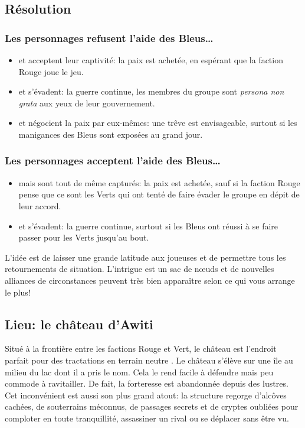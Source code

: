 \subsection{Résolution}

\subsubsection{Les personnages refusent l'aide des Bleus\dots}
\begin{itemize}
	\item et acceptent leur captivité: la paix est achetée, en espérant que la faction Rouge joue le jeu.
	\item et s'évadent: la guerre continue, les membres du groupe sont \emph{persona non grata} aux yeux de leur gouvernement.
	\item et négocient la paix par eux-mêmes: une trêve est envisageable, surtout si les manigances des Bleus sont exposées au grand jour.
\end{itemize}

\subsubsection{Les personnages acceptent l'aide des Bleus\dots}
\begin{itemize}
	\item mais sont tout de même capturés: la paix est achetée, sauf si la faction Rouge pense que ce sont les Verts qui ont tenté de faire évader le groupe en dépit de leur accord.
	\item et s'évadent: la guerre continue, surtout si les Bleus ont réussi à se faire passer pour les Verts jusqu'au bout.
\end{itemize}

L'idée est de laisser une grande latitude aux joueuses et de permettre tous les retournements de situation.
L'intrigue est un sac de nœuds et de nouvelles alliances de circonstances peuvent très bien apparaître selon ce qui vous arrange le plus!

\subsection*{Lieu: le château d'Awiti}

\begin{tcolorbox}[colback=black!1!white]
Situé à la frontière entre les factions Rouge et Vert, le château est l'endroit parfait pour des tractations en terrain \og neutre \fg.
Le château s'élève sur une île au milieu du lac dont il a pris le nom. Cela le rend facile à défendre mais peu commode à ravitailler.
De fait, la forteresse est abandonnée depuis des lustres.
Cet inconvénient est aussi son plus grand atout: la structure regorge d'alcôves cachées, de souterrains méconnus, de passages secrets et de cryptes oubliées pour comploter en toute tranquillité, assassiner un rival ou se déplacer sans être vu.
\end{tcolorbox}

